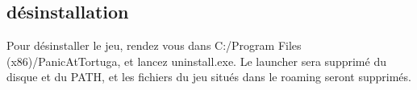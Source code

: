\subsection{désinstallation}

    Pour désinstaller le jeu, rendez vous dans C:/Program Files (x86)/PanicAtTortuga, 
    et lancez uninstall.exe. Le launcher sera supprimé du disque et du PATH, et les 
    fichiers du jeu situés dans le roaming seront supprimés.
